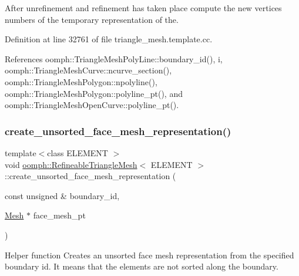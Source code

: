 After unrefinement and refinement has taken place compute the new vertices numbers of the temporary representation of the. 



Definition at line 32761 of file triangle\+\_\+mesh.\+template.\+cc.



References oomph\+::\+Triangle\+Mesh\+Poly\+Line\+::boundary\+\_\+id(), i, oomph\+::\+Triangle\+Mesh\+Curve\+::ncurve\+\_\+section(), oomph\+::\+Triangle\+Mesh\+Polygon\+::npolyline(), oomph\+::\+Triangle\+Mesh\+Polygon\+::polyline\+\_\+pt(), and oomph\+::\+Triangle\+Mesh\+Open\+Curve\+::polyline\+\_\+pt().

\mbox{\label{classoomph_1_1RefineableTriangleMesh_ab1268ab0f9ea49ef262e51a0e90136b5}} 
\subsubsection{\texorpdfstring{create\+\_\+unsorted\+\_\+face\+\_\+mesh\+\_\+representation()}{create\_unsorted\_face\_mesh\_representation()}}
{\footnotesize\ttfamily template$<$class E\+L\+E\+M\+E\+NT $>$ \\
void \hyperlink{classoomph_1_1RefineableTriangleMesh}{oomph\+::\+Refineable\+Triangle\+Mesh}$<$ E\+L\+E\+M\+E\+NT $>$\+::create\+\_\+unsorted\+\_\+face\+\_\+mesh\+\_\+representation (\begin{DoxyParamCaption}\item[{const unsigned \&}]{boundary\+\_\+id,  }\item[{\hyperlink{classoomph_1_1Mesh}{Mesh} $\ast$}]{face\+\_\+mesh\+\_\+pt }\end{DoxyParamCaption})\hspace{0.3cm}{\ttfamily [protected]}}



Helper function Creates an unsorted face mesh representation from the specified boundary id. It means that the elements are not sorted along the boundary. 



